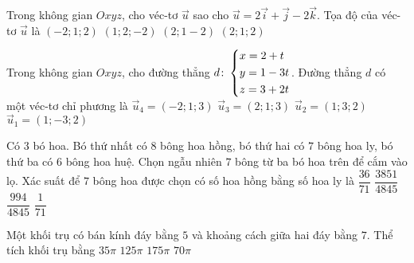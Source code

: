 \begin{ex}%
Trong không gian $Oxyz$, cho véc-tơ $\vec{u}$ sao cho $\vec{u}=2\vec{i}+\vec{j}-2\vec{k}$. Tọa độ của véc-tơ $\vec{u}$ là
\choice
{$(-2;1;2)$}
{$(1;2;-2)$}
{\True $(2;1-2)$}
{$(2;1;2)$}
\end{ex}
\begin{ex}%
Trong không gian $Oxyz$, cho đường thẳng $d\colon \left\{\begin{aligned}&x=2+t\\&y=1-3t\\&z=3+2t\end{aligned}\right.$.  Đường thẳng $d$ có một véc-tơ chỉ phương là
\choice
{$\vec{u}_4=(-2;1;3)$}
{$\vec{u}_3=(2;1;3)$}
{$\vec{u}_2=(1;3;2)$}
{\True $\vec{u}_1=(1;-3;2)$}
\end{ex}
\begin{ex}%
Có $3$ bó hoa. Bó thứ nhất có $8$ bông hoa hồng, bó thứ hai có $7$ bông hoa ly, bó thứ ba có $6$ bông hoa huệ. Chọn ngẫu nhiên $7$ bông từ ba bó hoa trên để cắm vào lọ. Xác suất để $7$ bông hoa được chọn có số hoa hồng bằng số hoa ly là
\choice
{$\dfrac{36}{71}$}
{$\dfrac{3851}{4845}$}
{\True $\dfrac{994}{4845}$}
{$\dfrac{1}{71}$}
\end{ex}
\begin{ex}%
Một khối trụ có bán kính đáy bằng $5$ và khoảng cách giữa hai đáy bằng $7$. Thể tích khối trụ bằng
\choice
{$35\pi$}
{$125\pi$}
{\True$175\pi$}
{$70\pi$}
\end{ex}
